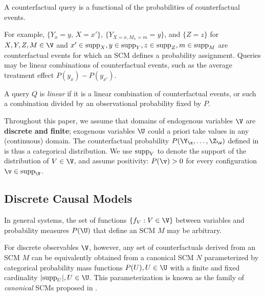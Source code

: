 \begin{definition}
A counterfactual query is a functional of the probabilities of counterfactual events.
\end{definition}
  
For example, $\{Y_x=y,\,X=x'\}$, $\{Y_{X=x,M_x=m}=y\}$, and $\{Z=z\}$ for $X,Y,Z,M\in\V$ and $x' \in \mathrm{supp}_X,y\in\mathrm{supp}_Y,z\in\mathrm{supp}_Z,m\in\mathrm{supp}_M$ are counterfactual events for which an SCM defines a probability assignment. Queries may be linear combinations of counterfactual events, such as the average treatment effect $P(y_{x})- P(y_{x'})$.

\begin{definition}
\label{def:linear-query}
A query $Q$ is \emph{linear} if it is a linear combination of counterfactual events, or such a combination divided by an observational probability fixed by $P$.
\end{definition}

Throughout this paper, we assume that domains of endogenous variables $\V$ are \textbf{discrete and finite}; exogenous variables $\U$ could a priori take values in any (continuous) domain. The counterfactual probability $P(\Y_\x, \ldots, \Z_\w)$ defined in  is thus a categorical distribution. We use $\mathrm{supp}_V$ to denote the support of the distribution of $V \in \V$, and assume positivity: $P(\v)>0$ for every configuration $\v\in\supp_\V$.

\subsection{Discrete Causal Models}
In general systems, the set of functions $\{f_V:V\in\V\}$ between variables and probability measures $P(\U)$ that define an SCM $M$ may be arbitrary.

For discrete observables $\V$, however, any set of counterfactuals derived from an SCM $M$ can be equivalently obtained from a canonical SCM $N$ parameterized by categorical probability mass functions $P(U), U\in\U$ with a finite and fixed cardinality $|\supp_U|, U\in\U$. This parameterization is known as the family of \emph{canonical} SCMs proposed in \citep[Def. 2.3]{zhang2022partial}.

